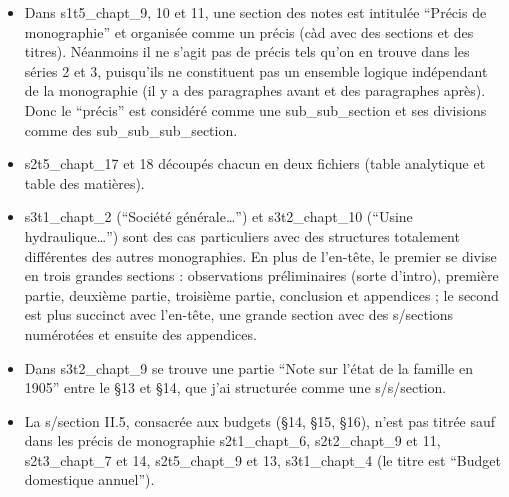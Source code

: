 \begin{itemize}
\item
  Dans s1t5\_chapt\_9, 10 et 11, une section des notes est intitulée
  ``Précis de monographie'' et organisée comme un précis (càd avec des
  sections et des titres). Néanmoins il ne s'agit pas de précis tels
  qu'on en trouve dans les séries 2 et 3, puisqu'ils ne constituent pas
  un ensemble logique indépendant de la monographie (il y a des
  paragraphes avant et des paragraphes après). Donc le ``précis'' est
  considéré comme une sub\_sub\_section et ses divisions comme des
  sub\_sub\_sub\_section.
\item
  s2t5\_chapt\_17 et 18 découpés chacun en deux fichiers (table
  analytique et table des matières).
\item
  s3t1\_chapt\_2 (``Société générale\ldots{}'') et s3t2\_chapt\_10
  (``Usine hydraulique\ldots{}'') sont des cas particuliers avec des
  structures totalement différentes des autres monographies. En plus de
  l'en-tête, le premier se divise en trois grandes sections :
  observations préliminaires (sorte d'intro), première partie, deuxième
  partie, troisième partie, conclusion et appendices ; le second est
  plus succinct avec l'en-tête, une grande section avec des s/sections
  numérotées et ensuite des appendices.
\item
  Dans s3t2\_chapt\_9 se trouve une partie ``Note sur l'état de la
  famille en 1905'' entre le §13 et §14, que j'ai structurée comme une
  s/s/section.
\item
  La s/section II.5, consacrée aux budgets (§14, §15, §16), n'est pas
  titrée sauf dans les précis de monographie s2t1\_chapt\_6,
  s2t2\_chapt\_9 et 11, s2t3\_chapt\_7 et 14, s2t5\_chapt\_9 et 13,
  s3t1\_chapt\_4 (le titre est ``Budget domestique annuel'').
\end{itemize}